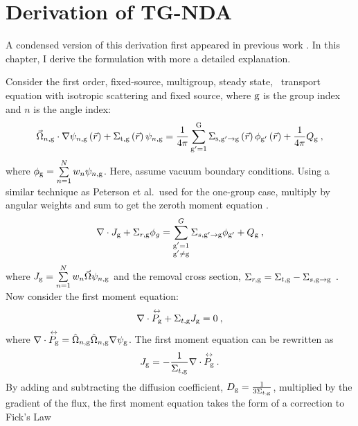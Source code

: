
\section{Derivation of TG-NDA}
A condensed version of this derivation first appeared in previous work \cite{Ramirez2017}. In this chapter, I derive the formulation with more a detailed explanation.

Consider the first order, fixed-source, multigroup, steady state, \sn\ transport equation with isotropic scattering and fixed source, where $\mathrm{g}$ is the group index and $n$ is the angle index:
  \begin{equation}
  \vec{\Omega}_{n,\mathrm{g}}\cdot \nabla \psi_{n,\mathrm{g}} \left(\vec{r}\right)+ \Sigma_{\mathrm{t},\mathrm{g}}\left(\vec{r}\right)\psi_{n,\mathrm{g}} = \frac{1}{4 \pi} \sum\limits_{\mathrm{g}'=1}^{\mathrm{G}} \Sigma_{\mathrm{s},{\mathrm{g}'}\to\mathrm{g}}\left(\vec{r}\right) \phi_{\mathrm{g}'}\left(\vec{r}\right) + \frac{1}{4 \pi} Q_{\mathrm{g}}\:,
  \end{equation}
where $\phi_{\mathrm{g}} = \sum\limits_{n=1}^N w_n \psi_{n, \mathrm{g}}$. Here, assume vacuum boundary conditions. 
Using a similar technique as Peterson et al.\ used for the one-group case, multiply by angular weights and sum to get the zeroth moment equation \cite{morel-holo}.
%
  \begin{equation}
  \nabla \cdot J_{\mathrm{g}} + \Sigma_{r,\mathrm{g}}\phi_g  = \sum_{\substack{\mathrm{g}'=1 \\ \mathrm{g}' \neq \mathrm{g}}}^G \Sigma_{s,\mathrm{g}' \rightarrow \mathrm{g}}\phi_{\mathrm{g}'} + Q_{\mathrm{g}}\:,
  \label{eq:zeroth_moment}
  \end{equation}
where $J_{\mathrm{g}} = \sum\limits_{n=1}^{N}w_n \vec{\Omega}\psi_{n, \mathrm{g}}$ and the removal cross section, $\Sigma_{r, \mathrm{g}} = \Sigma_{t, \mathrm{g}} - \Sigma_{s, \mathrm{g} \rightarrow \mathrm{g}}$ . 
  Now consider the first moment equation:
  \begin{equation}
  \nabla \cdot \overset{\text{\scriptsize$\leftrightarrow$}}{P_{\mathrm{g}}} + \Sigma_{t, \mathrm{g}} J_{\mathrm{g}} = 0\:,
  \end{equation}
where $\nabla \cdot \overset{\text{\scriptsize$\leftrightarrow$}}{P_{\mathrm{g}}} =  \hat{\Omega}_{n,\mathrm{g}} \hat{\Omega}_{n,\mathrm{g}} \nabla \psi_{\mathrm{g}}$. The first moment equation can be rewritten as
%
  \begin{equation}
  J_{\mathrm{g}} = -\frac{1}{\Sigma_{t, \mathrm{g}}} \nabla \cdot \overset{\text{\scriptsize$\leftrightarrow$}}{P_{\mathrm{g}}} \:. 
  \end{equation}
  By adding and subtracting the diffusion coefficient, $D_{\mathrm{g}} = \frac{1}{3\Sigma_{t, \mathrm{g}}}$, multiplied by the gradient of the flux, the first moment equation takes the form of a correction to Fick's Law
